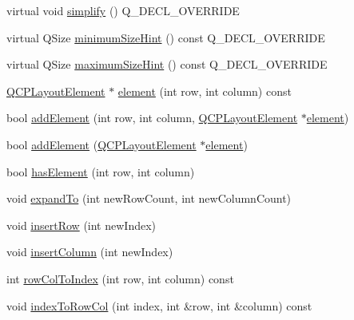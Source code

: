 \begin{DoxyCompactItemize}
\item 
virtual void \hyperlink{class_q_c_p_layout_grid_a38621ca7aa633b6a9a88617df7f08672}{simplify} () Q\+\_\+\+D\+E\+C\+L\+\_\+\+O\+V\+E\+R\+R\+I\+DE
\item 
virtual Q\+Size \hyperlink{class_q_c_p_layout_grid_a361c3f5906c21a6709cb8daf5a9e019f}{minimum\+Size\+Hint} () const Q\+\_\+\+D\+E\+C\+L\+\_\+\+O\+V\+E\+R\+R\+I\+DE
\item 
virtual Q\+Size \hyperlink{class_q_c_p_layout_grid_acb285925df25b54b3db25c7b1804d230}{maximum\+Size\+Hint} () const Q\+\_\+\+D\+E\+C\+L\+\_\+\+O\+V\+E\+R\+R\+I\+DE
\item 
\hyperlink{class_q_c_p_layout_element}{Q\+C\+P\+Layout\+Element} $\ast$ \hyperlink{class_q_c_p_layout_grid_a602b426609b4411cf6a93c3ddf3a381a}{element} (int row, int column) const
\item 
bool \hyperlink{class_q_c_p_layout_grid_adff1a2ca691ed83d2d24a4cd1fe17012}{add\+Element} (int row, int column, \hyperlink{class_q_c_p_layout_element}{Q\+C\+P\+Layout\+Element} $\ast$\hyperlink{class_q_c_p_layout_grid_a602b426609b4411cf6a93c3ddf3a381a}{element})
\item 
bool \hyperlink{class_q_c_p_layout_grid_a4c44025dd25acd27e053cadfd448ad7b}{add\+Element} (\hyperlink{class_q_c_p_layout_element}{Q\+C\+P\+Layout\+Element} $\ast$\hyperlink{class_q_c_p_layout_grid_a602b426609b4411cf6a93c3ddf3a381a}{element})
\item 
bool \hyperlink{class_q_c_p_layout_grid_ab0cf4f7edc9414a3bfaddac0f46dc0a0}{has\+Element} (int row, int column)
\item 
void \hyperlink{class_q_c_p_layout_grid_a886c0dcbabd51a45da399e044552b685}{expand\+To} (int new\+Row\+Count, int new\+Column\+Count)
\item 
void \hyperlink{class_q_c_p_layout_grid_a48af3dd7c3a653d9c3d7dd99bd02e838}{insert\+Row} (int new\+Index)
\item 
void \hyperlink{class_q_c_p_layout_grid_a1e880a321dbe8b43b471ccd764433dc4}{insert\+Column} (int new\+Index)
\item 
int \hyperlink{class_q_c_p_layout_grid_a682ba76f130810ffd294032a1bfbcfcb}{row\+Col\+To\+Index} (int row, int column) const
\item 
void \hyperlink{class_q_c_p_layout_grid_a577223db920e2acb34bc1091080c76d1}{index\+To\+Row\+Col} (int index, int \&row, int \&column) const
\end{DoxyCompactItemize}
